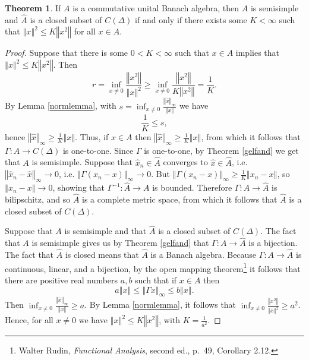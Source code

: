 \documentclass{article}
\newcommand{\norm}[1]{\left\Vert #1 \right\Vert}
\theoremstyle{definition}
\newtheorem{theorem}{Theorem}
\theoremstyle{definition}
\begin{document}
\begin{theorem}
If $A$ is a commutative unital Banach algebra, then
$A$ is semisimple and $\widehat{A}$ is a closed subset of $C(\Delta)$ if and only if there exists some $K<\infty$ such that 
$\norm{x}^2 \leq K \norm{x^2}$ for all $x \in A$.
\end{theorem}
\begin{proof}
Suppose that there is some $0<K<\infty$ such that $x \in A$ implies that $\norm{x}^2 \leq K \norm{x^2}$.
Then
\[
r=\inf_{x \neq 0} \frac{\norm{x^2}}{\norm{x}^2} \geq \inf_{x \neq 0} \frac{\norm{x^2}}{K\norm{x^2}} = \frac{1}{K}.
\]
By Lemma \ref{normlemma}, with $s=\inf_{x \neq 0} \frac{\norm{\hat{x}}_\infty}{\norm{x}}$ we have
\[
\frac{1}{K} \leq s,
\]
hence $\norm{\hat{x}}_\infty \geq \frac{1}{K} \norm{x}$.
Thus, if $x \in A$ then $\norm{\hat{x}}_\infty \geq \frac{1}{K}\norm{x}$, from which it follows that 
$\Gamma:A \to C(\Delta)$ is one-to-one. Since $\Gamma$ is one-to-one, by Theorem \ref{gelfand} we get that $A$ is semisimple.
Suppose that $\hat{x}_n \in \widehat{A}$ converges to $\hat{x} \in \widehat{A}$, i.e. $\norm{\hat{x}_n - \hat{x}}_\infty \to 0$, i.e.
$\norm{\Gamma(x_n-x)}_\infty \to 0$. But
$\norm{\Gamma(x_n-x)}_\infty \geq \frac{1}{K} \norm{x_n-x}$, so $\norm{x_n-x} \to 0$, showing that
$\Gamma^{-1}:\widehat{A} \to A$ is bounded. Therefore $\Gamma:A \to \widehat{A}$ is bilipschitz,
and so $\widehat{A}$ is a complete metric space, from which it follows that  $\widehat{A}$ is a closed subset of $C(\Delta)$.

Suppose that $A$ is semisimple and that $\widehat{A}$ is a closed subset of $C(\Delta)$.
The fact that $A$ is semisimple gives us by Theorem \ref{gelfand} that $\Gamma:A \to \widehat{A}$  is a bijection.
The fact that $\widehat{A}$ is closed means that $\widehat{A}$ is a Banach algebra.
Because $\Gamma:A \to \widehat{A}$ is continuous, linear, and a bijection, by the open mapping theorem\footnote{Walter Rudin, {\em Functional Analysis},
second ed., p.~49, Corollary 2.12.}  it follows that there are positive real numbers $a,b$ such that if $x \in A$ then
\[
a \norm{x} \leq \norm{\Gamma x}_\infty \leq b \norm{x}.
\]
Then $\inf_{x \neq 0} \frac{\norm{\hat{x}}_\infty}{\norm{x}} \geq a$. By Lemma \ref{normlemma}, it follows that
$\inf_{x \neq 0} \frac{\norm{x^2}}{\norm{x}^2} \geq a^2$. Hence, for all $x \neq 0$ we have $\norm{x}^2 \leq K \norm{x^2}$, with
$K=\frac{1}{a^2}$.
\end{proof}
\end{document}
